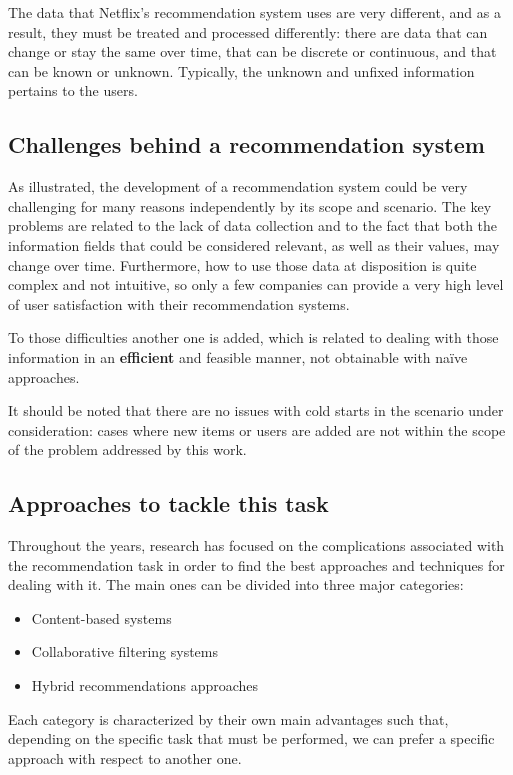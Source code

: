 The data that Netflix's recommendation system uses are very different, and as a result, they must be treated and processed differently: there are data that can change or stay the same over time, that can be discrete or continuous, and that can be known or unknown. Typically, the unknown and unfixed information pertains to the users.

\subsection{Challenges behind a recommendation system}
As illustrated, the development of a recommendation system could be very challenging for many reasons independently by its scope and scenario. The key problems are related to the lack of data collection and to the fact that both the information fields that could be considered relevant, as well as their values, may change over time.\cite{Macmanus-5Problems} Furthermore, how to use those data at disposition is quite complex and not intuitive, so only a few companies can provide a very high level of user satisfaction with their recommendation systems.

To those difficulties another one is added, which is related to dealing with those information in an \textbf{efficient} and feasible manner, not obtainable with na\"ive approaches. 

It should be noted that there are no issues with cold starts in the scenario under consideration: cases where new items or users are added  are not within the scope of the problem addressed by this work.

\subsection{Approaches to tackle this task}
Throughout the years, research has focused on the complications associated with the recommendation task in order to find the best approaches and techniques for dealing with it. The main ones can be divided into three major categories:
\begin{itemize}
  \item Content-based systems
  \item Collaborative filtering systems
  \item Hybrid recommendations approaches
\end{itemize}
Each category is characterized by their own main advantages such that, depending on the specific task that must be performed, we can prefer a specific approach with respect to another one.

